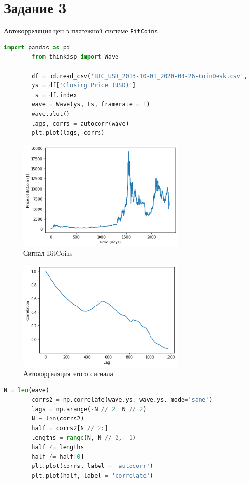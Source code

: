 \documentclass[a4paper, 12pt]{report}
\begin{document}
	\section{Задание 3}
	Автокорреляция цен в платежной системе \texttt{BitCoins}.
	\begin{lstlisting}[language=Python,caption=Метод Бартлетта]
		import pandas as pd
		from thinkdsp import Wave

		df = pd.read_csv('BTC_USD_2013-10-01_2020-03-26-CoinDesk.csv', parse_dates = [0])
		ys = df['Closing Price (USD)']
		ts = df.index
		wave = Wave(ys, ts, framerate = 1)
		wave.plot()
		lags, corrs = autocorr(wave)
		plt.plot(lags, corrs)
	\end{lstlisting}
	\begin{figure}[H]
		\centering
		\includegraphics[width=0.75\textwidth]{bit1.png}
		\caption{Сигнал BitCoins}
		\label{fig:bit1}
	\end{figure}
	\begin{figure}[H]
		\centering
		\includegraphics[width=0.75\textwidth]{bit2.png}
		\caption{Автокорреляция этого сигнала}
		\label{fig:bit2}
	\end{figure}
	\begin{lstlisting}[language=Python,caption=Снова сравним две функции]
		N = len(wave)
		corrs2 = np.correlate(wave.ys, wave.ys, mode='same')
		lags = np.arange(-N // 2, N // 2)
		N = len(corrs2)
		half = corrs2[N // 2:]
		lengths = range(N, N // 2, -1)
		half /= lengths
		half /= half[0]
		plt.plot(corrs, label = 'autocorr')
		plt.plot(half, label = 'correlate')
	\end{lstlisting}
\end{document}
